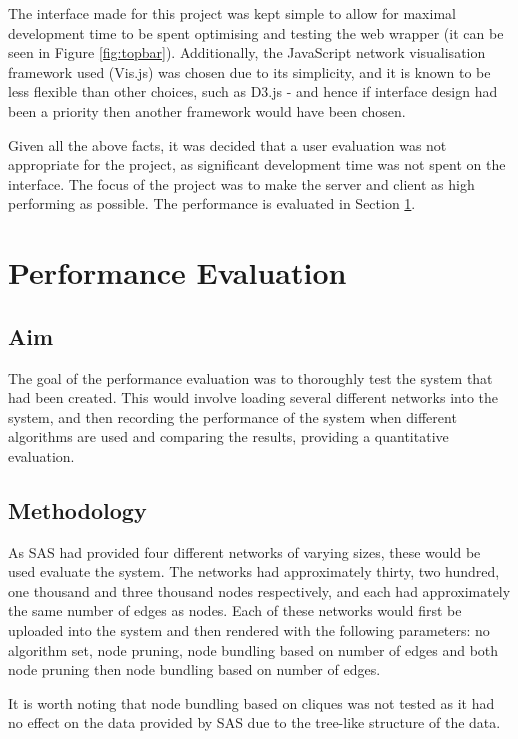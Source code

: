 \documentclass[../dissertation.tex]{subfiles}
\begin{document}
The interface made for this project was kept simple to allow for maximal development time to be spent optimising and testing the web wrapper (it can be seen in Figure \ref{fig:topbar}). Additionally, the JavaScript network visualisation framework used (Vis.js) was chosen due to its simplicity, and it is known to be less flexible than other choices, such as D3.js - and hence if interface design had been a priority then another framework would have been chosen. 

Given all the above facts, it was decided that a user evaluation was not appropriate for the project, as significant development time was not spent on the interface. The focus of the project was to make the server and client as high performing as possible. The performance is evaluated in Section \ref{sec:perf-eval}.

\section{Performance Evaluation}
\label{sec:perf-eval}

\subsection{Aim}

The goal of the performance evaluation was to thoroughly test the system that had been created. This would involve loading several different networks into the system, and then recording the performance of the system when different algorithms are used and comparing the results, providing a quantitative evaluation.

\subsection{Methodology}

As SAS had provided four different networks of varying sizes, these would be used evaluate the system. The networks had approximately thirty, two hundred, one thousand and three thousand nodes respectively, and each had approximately the same number of edges as nodes. Each of these networks would first be uploaded into the system and then rendered with the following parameters: no algorithm set, node pruning, node bundling based on number of edges and both node pruning then node bundling based on number of edges. 

It is worth noting that node bundling based on cliques was not tested as it had no effect on the data provided by SAS due to the tree-like structure of the data.
\end{document}
